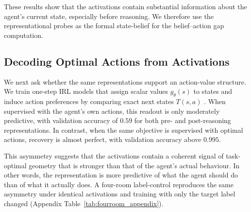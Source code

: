 \documentclass[10pt,twocolumn]{article}
\begin{document}
These results show that the activations contain substantial information about
the agent's current state, especially before reasoning. We therefore use the
representational probes as the formal state-belief for the
belief--action gap computation.

\subsection{Decoding Optimal Actions from Activations}

We next ask whether the same representations support an action-value
structure. We train one-step IRL models that assign scalar values
$g_\theta(s)$ to states and induce action preferences by comparing exact
next states $T(s,a)$ \cite{ng2000algorithms, ziebartMaximumEntropyInverse2008a}. When supervised with the agent's own actions, this
readout is only moderately predictive, with validation accuracy of $0.59$ for both pre- and post-reasoning representations. In contrast, when
the same objective is supervised with optimal actions, recovery is almost perfect, with validation
accuracy above $0.995$.

This asymmetry suggests that the activations contain a coherent signal of
task-optimal geometry that is stronger than that of the agent's actual behaviour. In other words, the representation is more predictive of
what the agent should do than of what it actually does.
A four-room label-control reproduces the same asymmetry under identical
activations and training with only the target label changed
(Appendix Table~\ref{tab:fourroom_appendix}).



\end{document}
